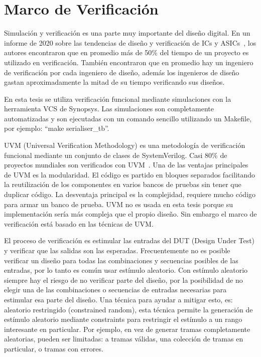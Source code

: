 \documentclass[a4paper, twoside, 11pt]{report}
\begin{document}
\section{Marco de Verificación}

Simulación y verificación es una parte muy importante del diseño digital. En un informe de 2020 sobre las tendencias de diseño y verificación de ICs y ASICs~\cite{verification_trends_2020}, los autores encontraron que en promedio más de 50\% del tiempo de un proyecto es utilizado en verificación. También encontraron que en promedio hay un ingeniero de verificación por cada ingeniero de diseño, además los ingenieros de diseño gastan aproximadamente la mitad de su tiempo verificando sus diseños.

En esta tesis se utiliza verificación funcional mediante simulaciones con la herramienta VCS de Synopsys. Las simulaciones son completamente automatizadas y son ejecutadas con un comando sencillo utilizando un Makefile, por ejemplo: “make serialiser\_tb”.

UVM (Universal Verification Methodology) es una metodología de verificación funcional mediante un conjunto de clases de SystemVerilog. Casi 80\% de proyectos mundiales son verificados con UVM~\cite{verification_trends_2020}. Una de las ventajas principales de UVM es la modularidad. El código es partido en bloques separados facilitando la reutilización de los componentes en varios bancos de pruebas sin tener que duplicar código. La desventaja principal es la complejidad, requiere mucho código para armar un banco de prueba. UVM no es usada en esta tesis porque su implementación sería más compleja que el propio diseño. Sin embargo el marco de verificación está basado en las técnicas de UVM.

El proceso de verificación es estimular las entradas del DUT (Design Under Test) y verificar que las salidas son las esperadas. Frecuentemente no es posible verificar un diseño para todas las combinaciones y secuencias posibles de las entradas, por lo tanto es común usar estímulo aleatorio. Con estímulo aleatorio siempre hay el riesgo de no verificar parte del diseño, por la posibilidad de no elegir una de las combinaciones o secuencias de entradas necesarias para estimular esa parte del diseño. Una técnica para ayudar a mitigar esto, es: aleatorio restringido (constrained random), esta técnica permite la generación de estímulo aleatorio mediante constraints para restringir el estímulo a un rango interesante en particular. Por ejemplo, en vez de generar tramas completamente aleatorias, pueden ser limitadas: a tramas válidas, una colección de tramas en particular, o tramas con errores.
\end{document}
